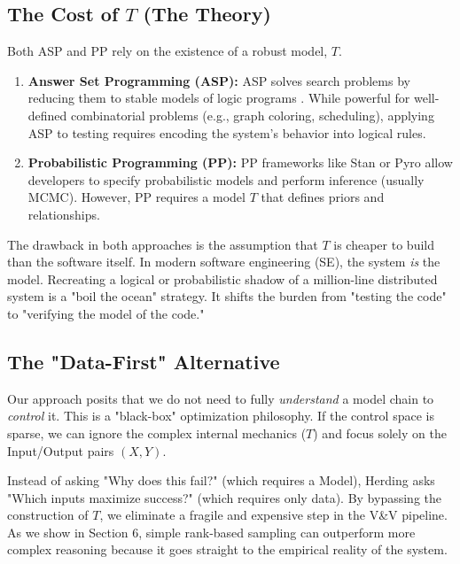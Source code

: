 \documentclass[pdflatex,sn-basic]{sn-jnl}
\begin{document}
\subsection{The Cost of $T$ (The Theory)}
Both ASP and PP rely on the existence of a robust model, $T$.
\begin{enumerate}
    \item \textbf{Answer Set Programming (ASP):} ASP solves search problems 
    by reducing them to stable models of logic programs \citep{Brewka2011}. While 
    powerful for well-defined combinatorial problems (e.g., graph coloring, 
    scheduling), applying ASP to testing requires encoding the system's 
    behavior into logical rules. 
    \item \textbf{Probabilistic Programming (PP):} PP frameworks like Stan 
    \citep{carpenter2017stan} or Pyro \citep{bingham2019pyro} allow developers to 
    specify probabilistic models and perform inference (usually MCMC). 
    However, PP requires a model  $T$ that defines priors and 
    relationships.
\end{enumerate}

The drawback in both approaches is the assumption that $T$ is cheaper to build 
than the software itself. In modern software engineering (SE), the system 
\textit{is} the model. Recreating a logical or probabilistic shadow of a 
million-line distributed system is a "boil the ocean" strategy. It shifts the 
burden from "testing the code" to "verifying the model of the code."

\subsection{The "Data-First" Alternative}
Our approach posits that we do not need to fully \textit{understand} a model 
chain to \textit{control} it. This is a "black-box" optimization philosophy. 
If the control space is sparse, we can ignore the complex internal mechanics 
($T$) and focus solely on the Input/Output pairs $(X, Y)$.

Instead of asking "Why does this fail?" (which requires a Model), Herding 
asks "Which inputs maximize success?" (which requires only data). By bypassing 
the construction of $T$, we eliminate a   fragile and expensive step in 
the V\&V pipeline. As we show in Section 6, simple rank-based sampling can
outperform more complex reasoning because it goes straight to the empirical 
reality of the system.
\end{document}

